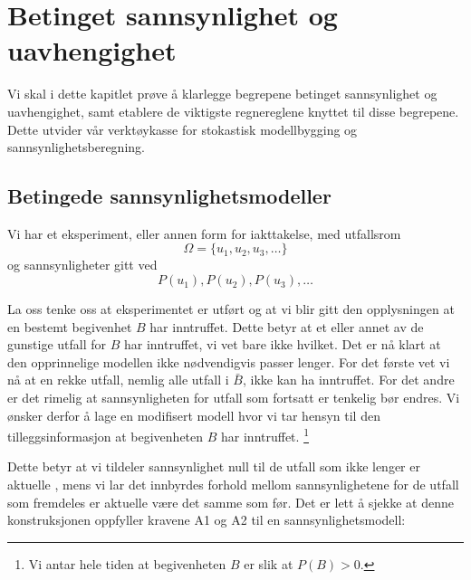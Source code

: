 \chapter{Betinget sannsynlighet og uavhengighet}
\label{kap:betinget} %

Vi skal i dette kapitlet prøve å klarlegge begrepene betinget
sannsynlighet og uavhengighet, samt etablere de viktigste regnereglene
 knyttet til disse begrepene. Dette utvider vår verktøykasse for
 stokastisk modellbygging og sannsynlighetsberegning.

\section{Betingede sannsynlighetsmodeller}

Vi har et eksperiment, eller annen form for iakttakelse, med utfallsrom
\[    \Omega = \{u_1, u_2, u_3, \ldots \} \]
og sannsynligheter gitt ved
\[     P(u_1), P(u_2), P(u_3), \ldots \]

\noindent La oss tenke oss at eksperimentet er utført og at vi blir gitt
den opplysningen at en bestemt begivenhet $B$ har inntruffet. Dette
betyr at et eller annet av de gunstige utfall for $B$ har
inntruffet, vi vet bare ikke hvilket. Det er nå klart at den
opprinnelige modellen ikke nødvendigvis passer lenger. For det
første vet vi nå at en rekke utfall, nemlig alle utfall i $\bar{B}$,
ikke kan ha inntruffet. For det andre er det rimelig at
sannsynligheten for utfall som fortsatt er tenkelig bør endres.
Vi ønsker derfor å lage en modifisert modell hvor vi tar hensyn
til den tilleggsinformasjon at begivenheten $B$ har inntruffet.
  \footnote{Vi antar hele tiden at begivenheten $B$ er slik at $P(B)>0$.}

\begin{center} 
\end{center}
Dette betyr at vi tildeler sannsynlighet null til de utfall som ikke 
lenger er aktuelle , mens vi lar det innbyrdes forhold
mellom sannsynlighetene for de utfall som fremdeles er aktuelle
være det samme som før. Det er lett å sjekke at denne
konstruksjonen oppfyller kravene A1 og A2 til en
sannsynlighetsmodell:


